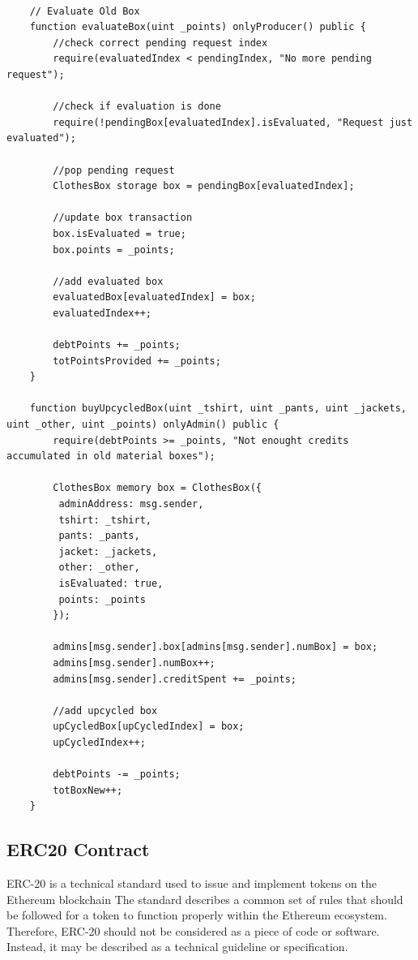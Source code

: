 \begin{lstlisting}[language=Solidity]
    
    // Evaluate Old Box
    function evaluateBox(uint _points) onlyProducer() public {
        //check correct pending request index
        require(evaluatedIndex < pendingIndex, "No more pending request");

        //check if evaluation is done
        require(!pendingBox[evaluatedIndex].isEvaluated, "Request just evaluated");

        //pop pending request
        ClothesBox storage box = pendingBox[evaluatedIndex];

        //update box transaction
        box.isEvaluated = true;
        box.points = _points;

        //add evaluated box
        evaluatedBox[evaluatedIndex] = box;
        evaluatedIndex++;

        debtPoints += _points;
        totPointsProvided += _points;
    }

    function buyUpcycledBox(uint _tshirt, uint _pants, uint _jackets, uint _other, uint _points) onlyAdmin() public {
        require(debtPoints >= _points, "Not enought credits accumulated in old material boxes");

        ClothesBox memory box = ClothesBox({
         adminAddress: msg.sender,
         tshirt: _tshirt,
         pants: _pants,
         jacket: _jackets,
         other: _other,
         isEvaluated: true,
         points: _points
        });

        admins[msg.sender].box[admins[msg.sender].numBox] = box;
        admins[msg.sender].numBox++;
        admins[msg.sender].creditSpent += _points;

        //add upcycled box
        upCycledBox[upCycledIndex] = box;
        upCycledIndex++;

        debtPoints -= _points;
        totBoxNew++;
    }

\end{lstlisting}

\subsection{ERC20 Contract}
\label{erc20}

ERC-20 is a technical standard used to issue and implement tokens on the Ethereum blockchain
The standard describes a common set of rules that should be followed for a token to function properly
 within the Ethereum ecosystem. Therefore, ERC-20 should not be considered as a piece of code or 
 software. Instead, it may be described as a technical guideline or specification.
\bigskip


